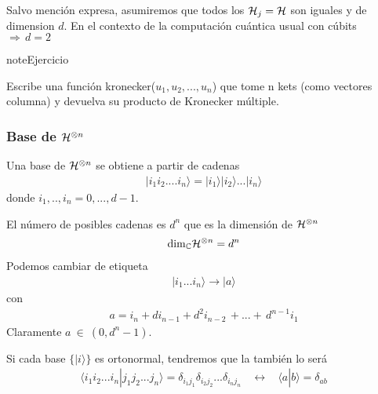 \documentclass[letterpaper,10pt,english]{jupyterBook}
\newcommand{\ket}[1]{|#1\rangle}
\newcommand{\braket}[2]{\langle #1|#2\rangle}
\newcommand{\Hil}{{\cal H}}
\begin{document}
\sphinxAtStartPar
Salvo mención expresa, asumiremos que todos los \(\Hil_j=\Hil\) son iguales y de dimension \(d\). En el contexto de la computación cuántica usual con cúbits \(\Rightarrow \, d=2\)

\begin{sphinxadmonition}{note}{Ejercicio}

\sphinxAtStartPar
Escribe una función  kronecker(\(u_1,u_2,...,u_n\)) que tome n kets (como vectores columna)  y devuelva su producto de Kronecker múltiple.
\end{sphinxadmonition}


\subsubsection{Base de \protect\(\Hil^{\otimes n}\protect\)}
\label{\detokenize{docs/Part_01_Formalismo/Chapter_01_02_Formalismo_matem_xe1tico/01_04_Tensores_myst:base-de-hil-otimes-n}}
\sphinxAtStartPar
Una base de \(\Hil^{\otimes n}\) se obtiene a partir de cadenas
\begin{equation*}
\begin{split}\ket{i_1 i_2.... i_n} = 
\ket{i_1}\ket{i_2}  ... \ket{i_n}\end{split}
\end{equation*}
\sphinxAtStartPar
donde \(i_1,..,i_n=0,...,d-1\).

\sphinxAtStartPar
El número de posibles cadenas es \(d^n\) que  es la dimensión de \(\Hil^{\otimes n}\)
\begin{equation*}
\begin{split}
{\rm dim}_{\mathbb C} \Hil^{\otimes n} = d^n
\end{split}
\end{equation*}
\sphinxAtStartPar
Podemos cambiar de etiqueta
\begin{equation*}
\begin{split}\ket{i_1...i_n} \to \ket{a}\end{split}
\end{equation*}
\sphinxAtStartPar
con
\begin{equation*}
\begin{split}
a = i_n + d i_{n-1} + d^2 i_{n-2} \, +...+ \,  d^{n-1} i_1
\end{split}
\end{equation*}
\sphinxAtStartPar
Claramente \(a ~\in ~(0,d^n-1)\).

\sphinxAtStartPar
Si cada base \(\{\ket{i}\}\) es ortonormal, tendremos que la  también lo será
\begin{equation*}
\begin{split}
\braket{i_1 i_2... i_n}{j_1j_2...j_n} = \delta_{i_1j_1}\delta_{i_2j_2}...\delta_{i_nj_n} ~~~~\leftrightarrow ~~~~
\braket{a}{b} = \delta_{ab}
\end{split}
\end{equation*}
\end{document}
